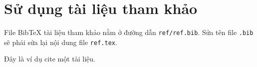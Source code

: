 \section{Sử dụng tài liệu tham khảo}

File BibTeX tài liệu tham khảo nằm ở đường dẫn \texttt{ref/ref.bib}. Sửa tên file \texttt{.bib} sẽ phải sửa lại nội dung file \texttt{ref.tex}.

Đây là ví dụ cite một tài liệu\cite{greenwade93}. \cite{hallucination}